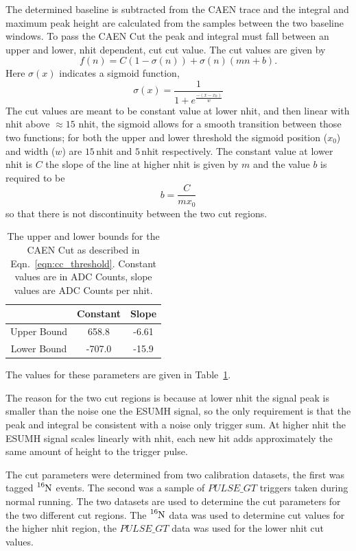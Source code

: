 \begin{appendices}
The determined baseline is subtracted from the CAEN trace and the integral and maximum
peak height are calculated from the samples between the two baseline windows.
To pass the CAEN Cut the peak and integral must fall between an upper and lower, nhit dependent,
cut cut value.
The cut values are given by
\begin{equation}
    f(n) = C\left(1-\sigma(n)\right) + \sigma(n)\left(mn+b\right)\text{.}
    \label{eqn:cc_threshold}
\end{equation}
Here $\sigma(x)$ indicates a sigmoid function,
\begin{equation}
    \sigma(x) = \frac{1}{1+e^{\frac{-(x-x_{0})}{w}}}
\end{equation}
The cut values are meant to be constant value at lower nhit, and then
linear with nhit above $\approx15$ nhit, the sigmoid allows for a smooth
transition between those two functions; for both the upper and lower threshold
the sigmoid position ($x_{0}$) and width ($w$) are $15$\,nhit and $5$\,nhit respectively.
The constant value at lower nhit is $C$ the slope of the line at higher nhit
is given by $m$ and the value $b$ is required to be
\begin{equation}
    b = \frac{C}{mx_{0}}
\end{equation}
so that there is not discontinuity between the two cut regions.
\begin{table}
    \centering
  \begin{tabular}{c | c c}
      & Constant & Slope  \\
      \hline
      Upper Bound & 658.8 & -6.61\\
      Lower Bound & -707.0 & -15.9\\
    \end{tabular}
    \caption[CAEN Cut Values]{The upper and lower bounds for the CAEN Cut as
    described in Eqn.~\eqref{eqn:cc_threshold}.
    Constant values are in ADC Counts, slope values are ADC Counts per nhit.}
\label{tbl:caen_cut}
\end{table}
The values for these parameters are given in Table~\ref{tbl:caen_cut}.

The reason for the two cut regions is because at lower nhit the signal
peak is smaller than the noise one the ESUMH signal, so the only requirement
is that the peak and integral be consistent with a noise only trigger sum.
At higher nhit the ESUMH signal scales linearly with nhit, each new hit
adds approximately the same amount of height to the trigger pulse.

The cut parameters were determined from two calibration datasets, the first was
tagged $\ce{^{16}N}$
events. The second was a sample of $PULSE\_GT$ triggers taken during normal
running.
The two datasets are used to determine the cut parameters for the two
different cut regions.
The $\ce{^{16}N}$ data was used to determine cut values for the higher nhit
region, the $PULSE\_GT$ data was used for the lower nhit cut values.


\end{appendices}
